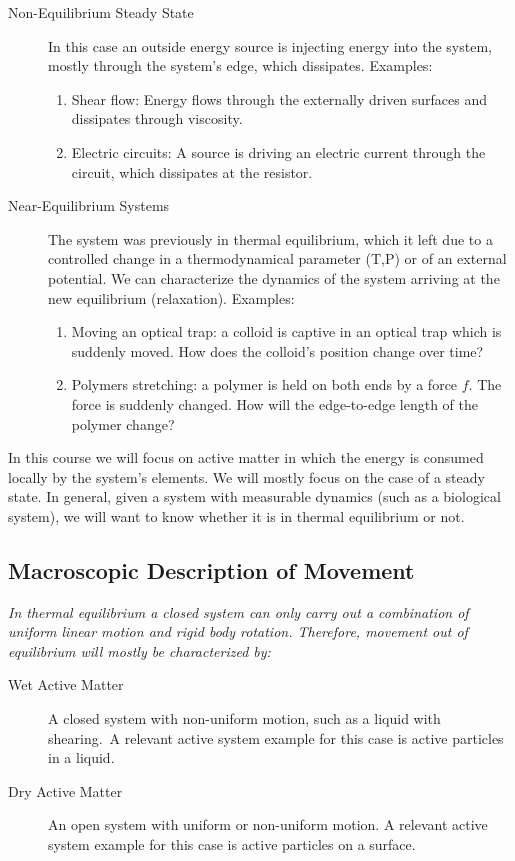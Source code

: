 \begin{description}
	\item[Non-Equilibrium Steady State] In this case an outside energy source is injecting energy into the system, mostly through the system's edge, which dissipates. Examples: \begin{enumerate}
		\item Shear flow: Energy flows through the externally driven surfaces and dissipates through viscosity.
		\item Electric circuits: A source is driving an electric current through the circuit, which dissipates at the resistor.
	\end{enumerate}
	\item[Near-Equilibrium Systems] The system was previously in thermal equilibrium, which it left due to a controlled change in a thermodynamical parameter (T,P) or of an external potential. We can characterize the dynamics of the system arriving at the new equilibrium (relaxation). Examples: \begin{enumerate}
		\item Moving an optical trap: a colloid is captive in an optical trap which is suddenly moved. How does the colloid's position change over time?
		\item Polymers stretching: a polymer is held on both ends by a force \(f\). The force is suddenly changed. How will the edge-to-edge length of the polymer change?
	\end{enumerate}
\end{description}

In this course we will focus on active matter in which the energy is consumed locally by the system's elements. We will mostly focus on the case of a steady state. In general, given a system with measurable dynamics (such as a biological system), we will want to know whether it is in thermal equilibrium or not.

\subsection{Macroscopic Description of Movement}\label{macro_movement}

\emph{In thermal equilibrium a closed system can only carry out a combination of uniform linear motion and rigid body rotation. Therefore, movement out of equilibrium will mostly be characterized by:}

\begin{description}
	\item[Wet Active Matter] A closed system with non-uniform motion, such as a liquid with shearing.\ A relevant active system example for this case is active particles in a liquid.
	\item[Dry Active Matter] An open system with uniform or non-uniform motion. A relevant active system example for this case is active particles on a surface.
\end{description}

